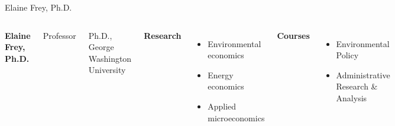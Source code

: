 \documentclass[10pt]{beamer}
\newlength{\imageheight}
\begin{document}
\begin{frame}{Elaine Frey, Ph.D.}
\begin{columns}[T,onlytextwidth]
    \raggedright
    {\large\bfseries Elaine Frey, Ph.D.}\par
    {Professor}\par
    {\footnotesize Ph.D., George Washington University}\par\vspace{0.4em}

    \textbf{Research}
    \begin{itemize}
      \item Environmental economics
      \item Energy economics
      \item Applied microeconomics
    \end{itemize}

    \textbf{Courses}
    \begin{itemize}
      \item Environmental Policy
      \item Administrative Research \& Analysis
    \end{itemize}

    \vspace*{0.25cm}
    \includegraphics[height=\imageheight]{images/frey.jpg}
\end{columns}
\end{frame}
\end{document}
